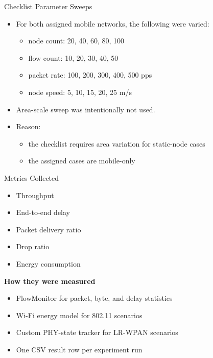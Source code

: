 \documentclass[aspectratio=169]{beamer}
\begin{document}
\begin{frame}{Checklist Parameter Sweeps}
  \begin{itemize}
    \item For both assigned mobile networks, the following were varied:
    \begin{itemize}
      \item node count: 20, 40, 60, 80, 100
      \item flow count: 10, 20, 30, 40, 50
      \item packet rate: 100, 200, 300, 400, 500 pps
      \item node speed: 5, 10, 15, 20, 25 m/s
    \end{itemize}
    \item Area-scale sweep was intentionally not used.
    \item Reason:
    \begin{itemize}
      \item the checklist requires area variation for static-node cases
      \item the assigned cases are mobile-only
    \end{itemize}
  \end{itemize}
\end{frame}

\begin{frame}{Metrics Collected}
  \begin{itemize}
    \item Throughput
    \item End-to-end delay
    \item Packet delivery ratio
    \item Drop ratio
    \item Energy consumption
  \end{itemize}

  \vspace{0.3cm}
  \textbf{How they were measured}
  \begin{itemize}
    \item FlowMonitor for packet, byte, and delay statistics
    \item Wi-Fi energy model for 802.11 scenarios
    \item Custom PHY-state tracker for LR-WPAN scenarios
    \item One CSV result row per experiment run
  \end{itemize}
\end{frame}
\end{document}
